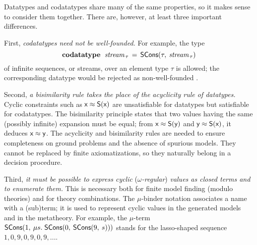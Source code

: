 Datatypes and codatatypes share many of the same properties, so it makes sense
to consider them together. There are, however, at least three important
differences.

First, \emph{codatatypes need not be well-founded.}
For example, the type
%
\[\textbf{codatatype}~\;\textit{stream}_{\,\tau} \,=\, \textsf{SCons}(\tau,\: \textit{stream}_{\,\tau})\]
%
of infinite sequences, or streams, over an element type $\tau$ is allowed; the
corresponding datatype would be rejected as non-well-founded \cite{blanchette-et-al-2015-esop}.

Second, \emph{a bisimilarity rule takes the place of the acyclicity rule of datatypes.}
Cyclic constraints such as
$\textsf{x} \approx \textsf{S}(\textsf{x})$ %
are unsatisfiable for datatypes but satisfiable for codatatypes.
The bisimilarity principle states that two values having the same (possibly
infinite) expansion must be equal; from $\textsf{x} \approx \textsf{S}(\textsf{y})$ and
$\textsf{y} \approx \textsf{S}(\textsf{x})$, it deduces $\textsf{x} \approx \textsf{y}$.
The acyclicity and bisimilarity rules are needed to ensure completeness on
ground problems and the absence of spurious models. They cannot be replaced by
finite axiomatizations, so they naturally belong in a decision procedure.

Third, \emph{it must be possible to express cyclic }(\emph{$\omega$-regular}) \emph{values as closed terms and
to enumerate them.} This is necessary both for finite model finding (modulo theories)
and for theory combinations. The $\mu$-binder notation associates a name with
a (sub)term; it is used to represent cyclic values in the generated models and
in the metatheory. For example,
the $\mu$-term $\textsf{SCons}(1,\: \mu s.\; \textsf{SCons}(0,\: \textsf{SCons}(9,\: s)))$
stands for the lasso-shaped sequence $1, 0, 9, 0, 9, 0, 9, \ldots$\afterLdots.




